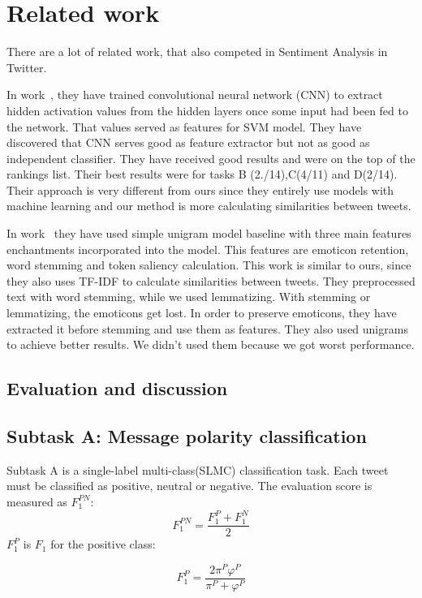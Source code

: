 \documentclass[runningheads,a4paper]{llncs}
\begin{document}
\section{Related work}
There are a lot of related work, that also competed in Sentiment Analysis in Twitter.

 In work~\cite{vilaresa2016lys}, they have trained convolutional neural network (CNN) to extract hidden activation values from the hidden layers once some input had been fed to the network. That values served as features for SVM model. They have discovered that CNN serves good as feature extractor but not as good as independent classifier. They have received good results and were on the top of the rankings list. Their best results were for tasks B (2./14),C(4/11) and D(2/14). Their approach is very different from ours since they entirely use models with machine learning and our method is more calculating similarities between tweets. 

In work~\cite{briones2016vcu} they have used simple unigram model baseline with three main features enchantments incorporated into the model. This features are emoticon retention, word stemming and token saliency calculation. This work is similar to ours, since they also uses TF-IDF to calculate similarities between tweets. They preprocessed text with word stemming, while we used lemmatizing. With stemming or lemmatizing, the emoticons get lost. In order to preserve emoticons, they have extracted it before stemming and use them as features. They also used unigrams to achieve better results. We didn't used them because we got worst performance.

\subsection{Evaluation and discussion}


\subsection{Subtask A: Message polarity classification}
Subtask A is a single-label multi-class(SLMC) classification task. Each tweet must be classified as positive, neutral or negative. The evaluation score is measured as $F^{PN}_1$:
\begin{equation}
F^{PN}_1 = \frac{F^P_1 + F^N_1}{2}
\end{equation}
$F_1^P$ is $F_1$ for the positive class:

\begin{equation}
F^{P}_1 = \frac{2\pi^P\varphi^P}{\pi^P + \varphi^P}
\end{equation}
\end{document}
